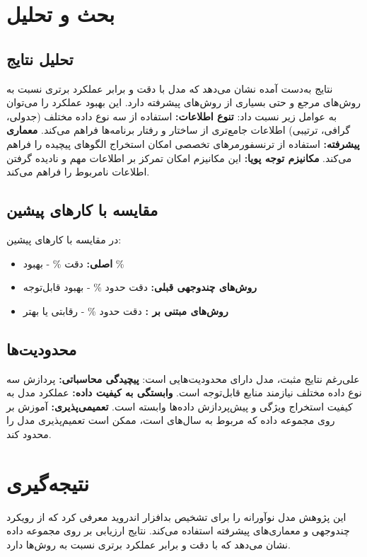 \documentclass[a4paper,oneside,12pt]{report}
\theoremstyle{definition}
\begin{document}
\section{بحث و تحلیل}
\subsection{تحلیل نتایج}
نتایج به‌دست آمده نشان می‌دهد که مدل  با دقت  و  برابر  عملکرد برتری نسبت به روش‌های مرجع و حتی بسیاری از روش‌های پیشرفته دارد. این بهبود عملکرد را می‌توان به عوامل زیر نسبت داد:
\textbf{تنوع اطلاعات:}
استفاده از سه نوع داده مختلف (جدولی، گرافی، ترتیبی) اطلاعات جامع‌تری از ساختار و رفتار برنامه‌ها فراهم می‌کند.
\textbf{معماری پیشرفته:}
استفاده از ترنسفورمرهای تخصصی امکان استخراج الگوهای پیچیده را فراهم می‌کند.
\textbf{مکانیزم توجه پویا:}
این مکانیزم امکان تمرکز بر اطلاعات مهم و نادیده گرفتن اطلاعات نامربوط را فراهم می‌کند.

\subsection{مقایسه با کارهای پیشین}
در مقایسه با کارهای پیشین:
\begin{itemize}
    \item \textbf{ اصلی:} دقت \% - بهبود \%
    \item \textbf{روش‌های چندوجهی قبلی:} دقت حدود \% - بهبود قابل‌توجه
    \item \textbf{روش‌های مبتنی بر :} دقت حدود \% - رقابتی یا بهتر
\end{itemize}

\subsection{محدودیت‌ها}
علی‌رغم نتایج مثبت، مدل  دارای محدودیت‌هایی است:
\textbf{پیچیدگی محاسباتی:}
پردازش سه نوع داده مختلف نیازمند منابع قابل‌توجه است.
\textbf{وابستگی به کیفیت داده:}
عملکرد مدل به کیفیت استخراج ویژگی و پیش‌پردازش داده‌ها وابسته است.
\textbf{تعمیمی‌پذیری:}
آموزش بر روی مجموعه داده  که مربوط به سال‌های  است، ممکن است تعمیم‌پذیری مدل را محدود کند.

\section{نتیجه‌گیری}
این پژوهش مدل نوآورانه  را برای تشخیص بدافزار اندروید معرفی کرد که از رویکرد چندوجهی و معماری‌های پیشرفته استفاده می‌کند. نتایج ارزیابی بر روی مجموعه داده  نشان می‌دهد که با دقت  و  برابر  عملکرد برتری نسبت به روش‌ها دارد.
\end{document}
